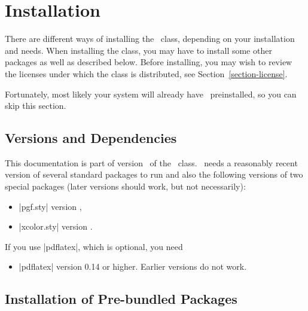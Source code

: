%
%
%

\section{Installation}
\label{section-installation}

There are different ways of installing the \beamer\ class, depending on your installation and needs. When installing the class, you may have to install some other packages as well as described below. Before installing, you may wish to review the licenses under which the class is distributed, see Section~\ref{section-license}.

Fortunately, most likely your system will already have \beamer\ preinstalled, so you can skip this section.


\subsection{Versions and Dependencies}

This documentation is part of version \beamerugversion\ of the \beamer\ class. \beamer\ needs a reasonably recent version of several standard packages to run and also the following versions of two special packages (later versions should work, but not necessarily):
\begin{itemize}
\item
  |pgf.sty| version \beamerugpgfversion,
\item
  |xcolor.sty| version \beamerugxcolorversion.
\end{itemize}

If you use |pdflatex|, which is optional, you need
\begin{itemize}
\item
  |pdflatex| version 0.14 or higher. Earlier versions do not work.
\end{itemize}


\subsection{Installation of Pre-bundled Packages}

